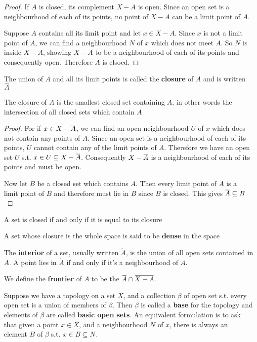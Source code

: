 \documentclass[11pt]{article}
\begin{document}
\begin{proof}
If \(A\) is closed, its complement \(X-A\) is open. Since an open set is a
neighbourhood of each of its points, no point of \(X-A\) can be a limit point
of \(A\).

Suppose \(A\) contains all its limit point and let \(x\in X-A\). Since \(x\)
is not a limit point of \(A\), we can find a neighbourhood \(N\) of \(x\)
which does not meet \(A\). So \(N\) is inside \(X-A\), showing \(X-A\) to be
a neighbourhood of each of its points and consequently open. Therefore \(A\)
is clsoed.
\end{proof}

The union of \(A\) and all its limit points is called the \textbf{closure} of \(A\)
and is written \(\bbar{A}\)

\begin{theorem}[]
The closure of \(A\) is the smallest closed set containing \(A\), in other
words the intersection of all closed sets which contain \(A\)
\end{theorem}

\begin{proof}
For if \(x\in X-\bbar{A}\), we can find an open neighbourhood \(U\) of \(x\)
which does not contain any points of \(A\). Since an open set is a
neighbourhood of each of its points, \(U\) cannot contain any of the limit
points of \(A\). Therefore we have an open set \(U\) s.t.
\(x\in U\subseteq X-\bbar{A}\). Consequently \(X-\bbar{A}\) is a
neighbourhood of each of its points and must be open.

Now let \(B\) be a closed set which contains \(A\). Then every limit point of
\(A\) is a limit point of \(B\) and therefore must lie in \(B\) since \(B\)
is closed. This gives \(\bbar{A}\subseteq B\)
\end{proof}

\begin{corollary}[]
A set is closed if and only if it is equal to its closure
\end{corollary}

A set whose closure is the whole space is said to be \textbf{dense} in the space

The \textbf{interior} of a set, usually written \(\mathring{A}\), is the union of
all open sets contained in \(A\). A point lies in \(\mathring{A}\) if and
only if it's a neighbourhood of \(A\).

We define the \textbf{frontier} of \(A\) to be the \(\bbar{A}\cap\bbar{X-A}\).

Suppose we have a topology on a set \(X\), and a collection \(\beta\) of open set
s.t. every open set is a union of members of \(\beta\). Then \(\beta\) is called a
\textbf{base} for the topology and elements of \(\beta\) are called \textbf{basic open sets}.
An equivalent formulation is to ask that given a point \(x\in X\), and a
neighbourhood \(N\) of \(x\), there is always an element \(B\) of \(\beta\) s.t.
\(x\in B\subseteq N\).
\end{document}
